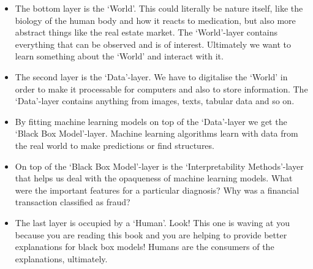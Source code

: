 \documentclass[12pt,]{krantz}
\providecommand{\tightlist}{%
  \setlength{\itemsep}{0pt}\setlength{\parskip}{0pt}}
\theoremstyle{definition}
\theoremstyle{definition}
\theoremstyle{definition}
\theoremstyle{remark}
\begin{document}
\begin{itemize}
\tightlist
\item
  The bottom layer is the `World'. This could literally be nature
  itself, like the biology of the human body and how it reacts to
  medication, but also more abstract things like the real estate market.
  The `World'-layer contains everything that can be observed and is of
  interest. Ultimately we want to learn something about the `World' and
  interact with it.
\item
  The second layer is the `Data'-layer. We have to digitalise the
  `World' in order to make it processable for computers and also to
  store information. The `Data'-layer contains anything from images,
  texts, tabular data and so on.
\item
  By fitting machine learning models on top of the `Data'-layer we get
  the `Black Box Model'-layer. Machine learning algorithms learn with
  data from the real world to make predictions or find structures.
\item
  On top of the `Black Box Model'-layer is the `Interpretability
  Methods'-layer that helps us deal with the opaqueness of machine
  learning models. What were the important features for a particular
  diagnosis? Why was a financial transaction classified as fraud?
\item
  The last layer is occupied by a `Human'. Look! This one is waving at
  you because you are reading this book and you are helping to provide
  better explanations for black box models! Humans are the consumers of
  the explanations, ultimately.
\end{itemize}
\end{document}

